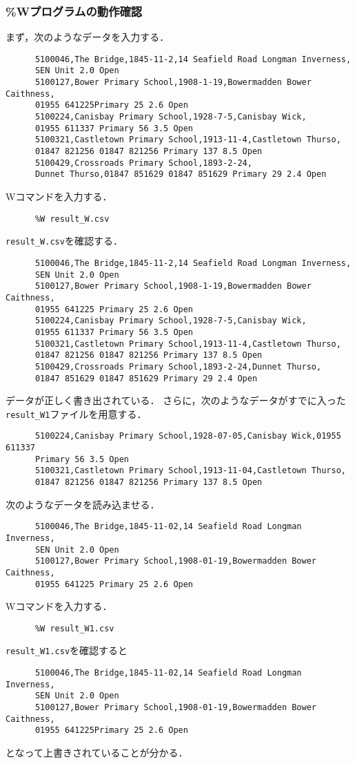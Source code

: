     \subsubsection{\%Wプログラムの動作確認}
    まず，次のようなデータを入力する．
    \begin{verbatim}
      5100046,The Bridge,1845-11-2,14 Seafield Road Longman Inverness,
      SEN Unit 2.0 Open
      5100127,Bower Primary School,1908-1-19,Bowermadden Bower Caithness,
      01955 641225Primary 25 2.6 Open
      5100224,Canisbay Primary School,1928-7-5,Canisbay Wick,
      01955 611337 Primary 56 3.5 Open
      5100321,Castletown Primary School,1913-11-4,Castletown Thurso,
      01847 821256 01847 821256 Primary 137 8.5 Open
      5100429,Crossroads Primary School,1893-2-24,
      Dunnet Thurso,01847 851629 01847 851629 Primary 29 2.4 Open
    \end{verbatim}
    Wコマンドを入力する．
    \begin{verbatim}
      %W result_W.csv
    \end{verbatim}
    \texttt{result\_W.csv}を確認する．
    \begin{verbatim}
      5100046,The Bridge,1845-11-2,14 Seafield Road Longman Inverness,
      SEN Unit 2.0 Open
      5100127,Bower Primary School,1908-1-19,Bowermadden Bower Caithness,
      01955 641225 Primary 25 2.6 Open
      5100224,Canisbay Primary School,1928-7-5,Canisbay Wick,
      01955 611337 Primary 56 3.5 Open
      5100321,Castletown Primary School,1913-11-4,Castletown Thurso,
      01847 821256 01847 821256 Primary 137 8.5 Open
      5100429,Crossroads Primary School,1893-2-24,Dunnet Thurso,
      01847 851629 01847 851629 Primary 29 2.4 Open
    \end{verbatim}
    データが正しく書き出されている．
    さらに，次のようなデータがすでに入った\texttt{result\_W1}ファイルを用意する．
    \begin{verbatim}
      5100224,Canisbay Primary School,1928-07-05,Canisbay Wick,01955 611337 
      Primary 56 3.5 Open
      5100321,Castletown Primary School,1913-11-04,Castletown Thurso,
      01847 821256 01847 821256 Primary 137 8.5 Open
    \end{verbatim}
    次のようなデータを読み込ませる．
    \begin{verbatim}
      5100046,The Bridge,1845-11-02,14 Seafield Road Longman Inverness,
      SEN Unit 2.0 Open
      5100127,Bower Primary School,1908-01-19,Bowermadden Bower Caithness,
      01955 641225 Primary 25 2.6 Open
    \end{verbatim}
    Wコマンドを入力する．
    \begin{verbatim}
      %W result_W1.csv
    \end{verbatim}
    \texttt{result\_W1.csv}を確認すると
    \begin{verbatim}
      5100046,The Bridge,1845-11-02,14 Seafield Road Longman Inverness,
      SEN Unit 2.0 Open
      5100127,Bower Primary School,1908-01-19,Bowermadden Bower Caithness,
      01955 641225Primary 25 2.6 Open
    \end{verbatim}
    となって上書きされていることが分かる．
    

